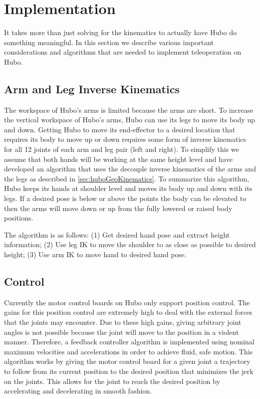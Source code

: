 \documentclass[letterpaper, 10 pt, conference]{IEEEtran}
\begin{document}
\section{Implementation} \label{sec:implementation}
It takes more than just solving for the kinematics to actually have Hubo do something meaningful. In this section we describe various important considerations and algorithms that are needed to implement teleoperation on Hubo.

\subsection{Arm and Leg Inverse Kinematics} \label{sec:armAndLegIK}
The workspace of Hubo's arms is limited because the arms are short. To increase the vertical workspace of Hubo's arms, Hubo can use its legs to move its body up and down. Getting Hubo to move its end-effector to a desired location that requires its body to move up or down requires some form of inverse kinematics for all 12 joints of each arm and leg pair (left and right). To simplify this we assume that both hands will be working at the same height level and have developed an algorithm that uses the decouple inverse kinematics of the arms and the legs as described in \cref{sec:huboGeoKinematics}. To summarize this algorithm, Hubo keeps its hands at shoulder level and moves its body up and down with its legs. If a desired pose is below or above the points the body can be elevated to then the arms will move down or up from the fully lowered or raised body positions. 

The algorithm is as follows: (1) Get desired hand pose and extract height information; (2) Use leg IK to move the shoulder to as close as possible to desired height; (3) Use arm IK to move hand to desired hand pose.

\subsection{Control} \label{subsec:control}
Currently the motor control boards on Hubo only support position control. The gains for this position control are extremely high to deal with the external forces that the joints may encounter. Due to these high gains, giving arbitrary joint angles is not possible because the joint will move to the position in a violent manner. Therefore, a feedback controller algorithm is implemented using nominal maximum velocities and accelerations in order to achieve fluid, safe motion. This algorithm works by giving the motor control board for a given joint a trajectory to follow from its current position to the desired position that minimizes the jerk on the joints. This allows for the joint to reach the desired position by accelerating and decelerating in smooth fashion.
\end{document}
